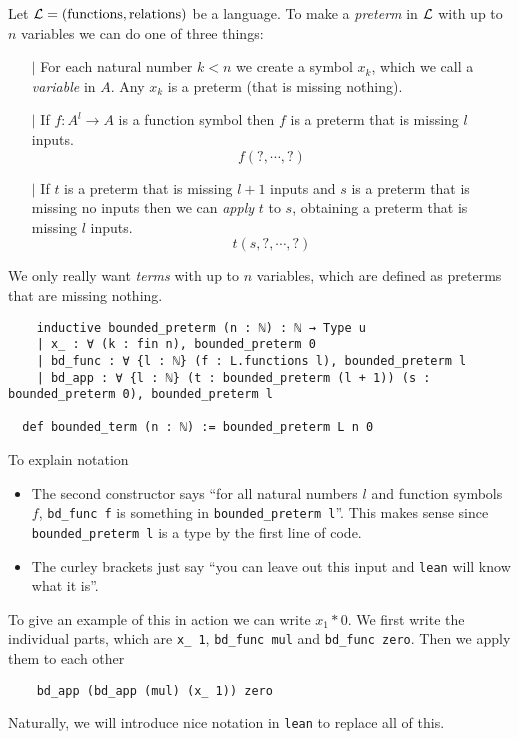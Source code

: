 \begin{dfn}[Terms]
  Let $\mathcal{L} = (\operatorname{functions}, \operatorname{relations})$ be a language.
  To make a \textit{preterm} in $\mathcal{L}$ with up to $n$ variables
  we can do one of three things:
  \begin{itemize}
    \item[$\vert$] For each natural number $k < n$ we create a symbol
          $x_{k}$, which we call a \textit{variable} in $A$.
          Any $x_{k}$ is a preterm (that is missing nothing).
    \item[$\vert$] If $f : A^{l} \to A$ is a function symbol then
          $f$ is a preterm that is missing $l$ inputs.
          \[ f( ? , \cdots , ? )\]
    \item[$\vert$] If $t$ is a preterm that is missing
          $l + 1$ inputs and $s$ is a preterm that is missing
          no inputs then we can \textit{apply} $t$ to $s$, obtaining
          a preterm that is missing $l$ inputs.
          \[ t(s , ? , \cdots, ? )\]
  \end{itemize}

  We only really want \textit{terms} with up to $n$ variables,
  which are defined as preterms that are missing nothing.

  \begin{lstlisting}
    inductive bounded_preterm (n : ℕ) : ℕ → Type u
    | x_ : ∀ (k : fin n), bounded_preterm 0
    | bd_func : ∀ {l : ℕ} (f : L.functions l), bounded_preterm l
    | bd_app : ∀ {l : ℕ} (t : bounded_preterm (l + 1)) (s : bounded_preterm 0), bounded_preterm l

  def bounded_term (n : ℕ) := bounded_preterm L n 0\end{lstlisting}

  To explain notation
  \begin{itemize}
    \item The second constructor says ``for all natural numbers $l$ and function symbols $f$,
          \texttt{bd\_func f} is something in \texttt{bounded\_preterm l}''.
          This makes sense since \texttt{bounded\_preterm l} is a type by the first line of code.
    \item The curley brackets just say
          ``you can leave out this input and \texttt{lean} will know what it is''.
  \end{itemize}

  To give an example of this in action we can write $x_{1} * 0$.
  We first write the individual parts, which are
  \texttt{x\_ 1}, \texttt{bd\_func mul} and
  \texttt{bd\_func zero}.
  Then we apply them to each other
  \begin{lstlisting}
    bd_app (bd_app (mul) (x_ 1)) zero \end{lstlisting}
  Naturally, we will introduce nice notation in \texttt{lean} to replace all of this.
\end{dfn}

